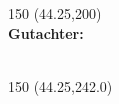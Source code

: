 \begin{titlepage}
\begin{textblock}{150} (44.25,200)
  \large \textsf
  {\fontsize{14pt}{14pt}\\
  \textbf{Gutachter:}\\
  \Erstgutachter\\
  \Zweitgutachter}
\end{textblock}

\begin{textblock}{150} (44.25,242.0)
  \fontsize{11.75pt}{11.75pt}
  \textcolor{TUGreen}{\textsf \Lehrstuhl}\\
  \textcolor{TUGreen}{\textsf \Lehrstuhltitel}\\
  \textcolor{TUGreen}{\textsf \Universitaet}
\end{textblock}

\end{titlepage}
